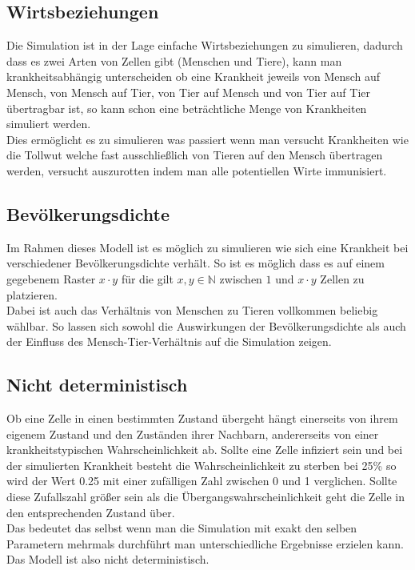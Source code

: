 \subsection*{Wirtsbeziehungen}
Die Simulation ist in der Lage einfache Wirtsbeziehungen zu simulieren, dadurch dass es zwei Arten von Zellen gibt (Menschen und Tiere), kann man krankheitsabhängig unterscheiden ob eine Krankheit jeweils von Mensch auf Mensch, von Mensch auf Tier, von Tier auf Mensch und von Tier auf Tier übertragbar ist, so kann schon eine beträchtliche Menge von Krankheiten simuliert werden.\\
Dies ermöglicht es zu simulieren was passiert wenn man versucht Krankheiten wie die Tollwut welche fast ausschließlich von Tieren auf den Mensch übertragen werden, versucht auszurotten indem man alle potentiellen Wirte immunisiert.

\subsection*{Bevölkerungsdichte}
Im Rahmen dieses Modell ist es möglich zu simulieren wie sich eine Krankheit bei verschiedener Bevölkerungsdichte verhält. So ist es möglich dass es auf einem gegebenem Raster $x\cdot y$ für die gilt $ x,y \in \mathbb{N}$ zwischen $1$ und $x\cdot y$ Zellen zu platzieren.\\
Dabei ist auch das Verhältnis von Menschen zu Tieren vollkommen beliebig wählbar. So lassen sich  sowohl die Auswirkungen der Bevölkerungsdichte als auch der Einfluss des Mensch-Tier-Verhältnis auf die Simulation zeigen.

\subsection*{Nicht deterministisch}
Ob eine Zelle in einen bestimmten Zustand übergeht hängt einerseits von ihrem eigenem Zustand und den Zuständen ihrer Nachbarn, andererseits von einer krankheitstypischen Wahrscheinlichkeit ab. Sollte eine Zelle infiziert sein und bei der simulierten Krankheit besteht die Wahrscheinlichkeit zu sterben bei 25\% so wird der Wert 0.25 mit einer zufälligen Zahl zwischen 0 und 1 verglichen. Sollte diese Zufallszahl größer sein als die Übergangswahrscheinlichkeit geht die Zelle in den entsprechenden Zustand über.\\
Das bedeutet das selbst wenn man die Simulation mit exakt den selben Parametern mehrmals durchführt man unterschiedliche Ergebnisse erzielen kann. Das Modell ist also nicht deterministisch.


%
%
%
%
%
